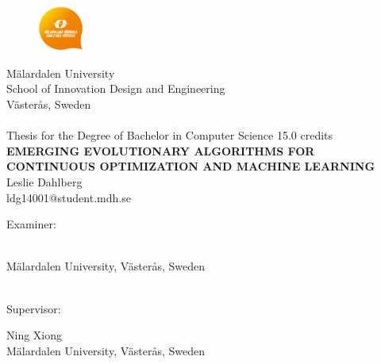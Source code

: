 
\begin{center}
		\begin{figure}[t]
				\includegraphics[width=15mm, bb=0 0 100 100]{MDHlogga.png}
		\end{figure}
                 	\Large M\"{a}lardalen University \\
			\Large School of Innovation Design and Engineering \\
                        \Large V\"{a}ster\r{a}s, Sweden\\

                        \noindent\makebox[\linewidth]{\rule{\textwidth}{0.4pt}}\\[0.5cm]

                \Large{Thesis for the Degree of Bachelor in Computer Science 15.0 credits}\\[2.0cm]

			\huge \textbf{\uppercase{Emerging Evolutionary Algorithms for Continuous Optimization and Machine Learning}} \\ [2.5cm] %

			\LARGE Leslie Dahlberg   \\
        	\large ldg14001@student.mdh.se \\[2.5cm]

\begin{flushleft}
			\Large Examiner: \begin{minipage}[t]{0,7\textwidth}\Large \\\large M\"{a}lardalen University, \large V\"{a}ster\r{a}s, Sweden\\ \end{minipage}\\[0.5cm]

			\Large Supervisor: \begin{minipage}[t]{0,7\textwidth}\Large Ning Xiong\\\large M\"{a}lardalen University, \large V\"{a}ster\r{a}s, Sweden \end{minipage} \\[0.5cm]


\end{flushleft}
\end{center}
